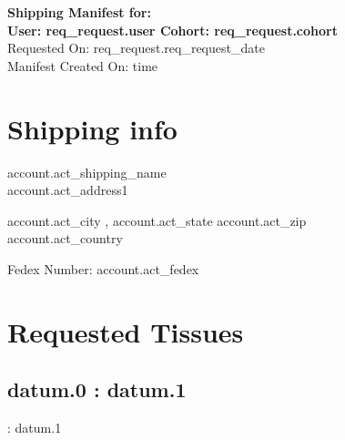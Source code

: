 \documentclass{article}[letterpaper]
\begin{document}
\begin{center}
\Large{ \textbf{Shipping Manifest for:\\ User: {{ req_request.user }} Cohort: {{ req_request.cohort }}
 } } \\
\normalsize{Requested On: {{ req_request.req_request_date }} \\
Manifest Created On: {{ time }} }
\end{center}

\section*{Shipping info}

{{ account.act_shipping_name }} \\
{{ account.act_address1 }} \\{%
{{ account.act_city }}, {{ account.act_state }} {{ account.act_zip }} \\
{{ account.act_country }}

\vspace{0.1in}
\noindent Fedex Number: {{ account.act_fedex }}

\section*{Requested Tissues}

{%
  {%
  {%
    {%
      \subsection*{ {{ datum.0 }}: {{ datum.1 }} }
    {%
      : {{ datum.1 }}
    {%
  {%

  \vspace{0.05in}
  {%
}}}}}}}}}
\end{document}
